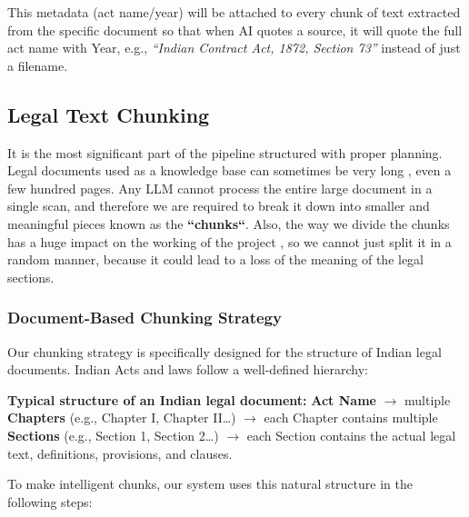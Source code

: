 \documentclass[12pt,a4paper]{article}
\begin{document}
This metadata (act name/year) will be attached to every chunk of text extracted from the specific document so that when AI quotes a source, it will quote the full act name with Year, e.g., \textit{``Indian Contract Act, 1872, Section 73''} instead of just a filename.
\subsection{Legal Text Chunking}


It is the most significant part of the pipeline structured with proper planning. Legal documents used as a knowledge base can sometimes be very long , even a few hundred pages. Any LLM cannot process the entire large document in a single scan, and therefore we are required to break it down into smaller and meaningful pieces known as the \textbf{``chunks``}. Also, the way we divide the chunks has a huge impact on the working of the project , so we cannot just split it in a random manner, because it could lead to a loss of the meaning of the legal sections.

\subsubsection{Document-Based Chunking Strategy}

Our chunking strategy is specifically designed for the structure of Indian legal documents. Indian Acts and laws follow a well-defined hierarchy:

\begin{highlightbox}
\textbf{Typical structure of an Indian legal document:} \textbf{Act Name} $\rightarrow$ multiple \textbf{Chapters} (e.g., Chapter I, Chapter II\ldots) $\rightarrow$ each Chapter contains multiple \textbf{Sections} (e.g., Section 1, Section 2\ldots) $\rightarrow$ each Section contains the actual legal text, definitions, provisions, and clauses.
\end{highlightbox}

To make intelligent chunks, our system uses this natural structure in the following steps:
\end{document}
